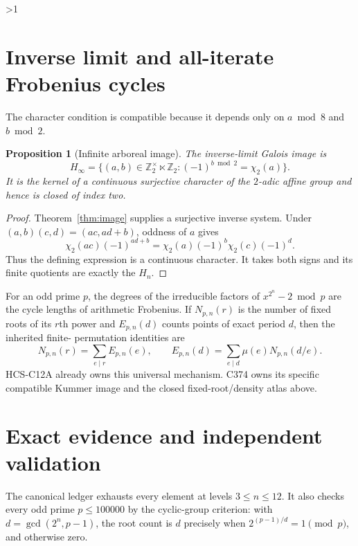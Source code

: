 \documentclass[10pt]{article}
\newtheorem{proposition}{Proposition}
\newcommand{\Z}{\mathbb Z}
\begin{document}
\ifnum\CRevisionRound>1
\section{Inverse limit and all-iterate Frobenius cycles}
The character condition is compatible because it depends only on
$a\bmod8$ and $b\bmod2$.

\begin{proposition}[Infinite arboreal image]\label{prop:limit}
The inverse-limit Galois image is
\[
 H_\infty=\{(a,b)\in\Z_2^\times\ltimes\Z_2:
          (-1)^{b\bmod2}=\chi_2(a)\}.
\]
It is the kernel of a continuous surjective character of the $2$-adic
affine group and hence is closed of index two.
\end{proposition}

\begin{proof}
Theorem~\ref{thm:image} supplies a surjective inverse system.  Under
$(a,b)(c,d)=(ac,ad+b)$, oddness of $a$ gives
\[
 \chi_2(ac)(-1)^{ad+b}
 =\chi_2(a)(-1)^b\chi_2(c)(-1)^d.
\]
Thus the defining expression is a continuous character.  It takes both
signs and its finite quotients are exactly the $H_n$.
\end{proof}

For an odd prime $p$, the degrees of the irreducible factors of
$x^{2^n}-2\bmod p$ are the cycle lengths of arithmetic Frobenius.  If
$N_{p,n}(r)$ is the number of fixed roots of its $r$th power and
$E_{p,n}(d)$ counts points of exact period $d$, then the inherited finite-
permutation identities are
\[
 N_{p,n}(r)=\sum_{e\mid r}E_{p,n}(e),\qquad
 E_{p,n}(d)=\sum_{e\mid d}\mu(e)N_{p,n}(d/e).
\]
HCS-C12A already owns this universal mechanism.  C374 owns its specific
compatible Kummer image and the closed fixed-root/density atlas above.

\section{Exact evidence and independent validation}
The canonical ledger exhausts every element at levels $3\le n\le12$.
It also checks every odd prime $p\le100000$ by the cyclic-group criterion:
with $d=\gcd(2^n,p-1)$, the root count is $d$ precisely when
$2^{(p-1)/d}=1\pmod p$, and otherwise zero.
\end{document}
